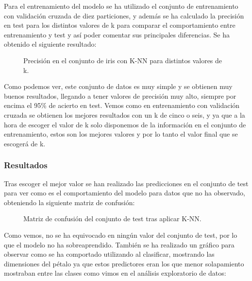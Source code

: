 Para el entrenamiento del modelo se ha utilizado el conjunto de entrenamiento con validación cruzada de diez particiones, y además se ha calculado la precisión en test para los distintos valores de k para comparar el comportamiento entre entrenamiento y test y así poder comentar sus principales diferencias. Se ha obtenido el siguiente resultado:

\begin{figure}[H]
	\centering
	
	\caption{Precisión en el conjunto de iris con K-NN para distintos valores de k.}
	\label{fig:avance_accuracy_iris}
\end{figure}

Como podemos ver, este conjunto de datos es muy simple y se obtienen muy buenos resultados, llegando a tener valores de precisión muy alto, siempre por encima el 95\% de acierto en test. Vemos como en entrenamiento con validación cruzada se obtienen los mejores resultados con un k de cinco o seis, y ya que a la hora de escoger el valor de k solo disponemos de la información en el conjunto de entrenamiento, estos son los mejores valores y por lo tanto el valor final que se escogerá de k.

\subsubsection{Resultados}

Tras escoger el mejor valor se han realizado las predicciones en el conjunto de test para ver como es el comportamiento del modelo para datos que no ha observado, obteniendo la siguiente matriz de confusión:

\begin{figure}[H]
	\centering
	
	\caption{Matriz de confusión del conjunto de test tras aplicar K-NN.}
	\label{fig:matriz_confusion_knn}
\end{figure}

Como vemos, no se ha equivocado en ningún valor del conjunto de test, por lo que el modelo no ha sobreaprendido. También se ha realizado un gráfico para observar como se ha comportado utilizando al clasificar, mostrando las dimensiones del pétalo ya que estos predictores eran los que menor solapamiento mostraban entre las clases como vimos en el análisis exploratorio de datos:

\begin{figure}[H]
	\centering
	
	\label{fig:predicciones_knn}
\end{figure}

